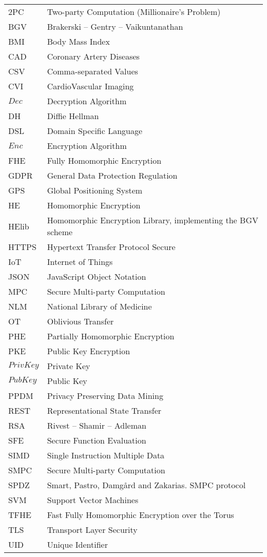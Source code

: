 \abbreviations
\begin{center}
	\renewcommand{\arraystretch}{1.5}
	\begin{longtable}{ l @{\qquad} l }
	\toprule
	2PC       & Two-party Computation (Millionaire's Problem) \\
	BGV       & Brakerski -- Gentry -- Vaikuntanathan \\
	BMI       & Body Mass Index \\
	CAD 			& Coronary Artery Diseases \\
	CSV 			& Comma-separated Values \\
	CVI 			& CardioVascular Imaging \\
	$Dec$     & Decryption Algorithm \\
	DH				& Diffie Hellman \\
	DSL       & Domain Specific Language \\
	$Enc$     & Encryption Algorithm \\
	FHE       & Fully Homomorphic Encryption \\
	GDPR 			& General Data Protection Regulation\\
	GPS 			& Global Positioning System \\
	HE        & Homomorphic Encryption \\
	HElib     & Homomorphic Encryption Library, implementing the BGV scheme \\
	HTTPS 		& Hypertext Transfer Protocol Secure \\
	IoT				& Internet of Things \\
	JSON 			& JavaScript Object Notation \\
	MPC 			& Secure Multi-party Computation \\
	NLM 			& National Library of Medicine \\
	OT        & Oblivious Transfer \\
	PHE       & Partially Homomorphic Encryption \\
	PKE 			& Public Key Encryption \\
	$PrivKey$	& Private Key \\
	$PubKey$  & Public Key \\
	PPDM      & Privacy Preserving Data Mining \\
	REST      & Representational State Transfer \\
	RSA				& Rivest -- Shamir -- Adleman \\
	SFE       & Secure Function Evaluation \\
	SIMD      & Single Instruction Multiple Data \\
	SMPC 			& Secure Multi-party Computation \\
	SPDZ      & Smart, Pastro, Damg{\aa}rd and Zakarias. SMPC protocol \\
	SVM 			& Support Vector Machines \\
	TFHE      & Fast Fully Homomorphic Encryption over the Torus \\
	TLS 			& Transport Layer Security \\
	UID 			& Unique Identifier \\

	\bottomrule
	\end{longtable}
\end{center}
